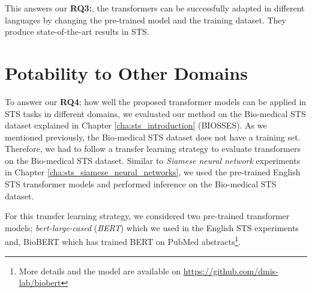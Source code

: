 This answers our \textbf{RQ3:}, the transformers can be successfully adapted in different languages by changing the pre-trained model and the training dataset. They produce state-of-the-art results in STS.

\section{Potability to Other Domains}
\label{sec:transformer_domain}
To answer our \textbf{RQ4}; how well the proposed transformer models can be applied in STS tasks in different domains, we evaluated our method on the Bio-medical STS dataset explained in Chapter \ref{cha:sts_introduction} (BIOSSES). As we mentioned previously, the Bio-medical STS dataset does not have a training set. Therefore, we had to follow a transfer learning strategy to evaluate transformers on the Bio-medical STS dataset. Similar to \textit{Siamese neural network} experiments in Chapter \ref{cha:sts_siamese_neural_networks}, we used the pre-trained English STS transformer models and performed inference on the Bio-medical STS dataset. 

For this transfer learning strategy, we considered two pre-trained transformer models; \textit{bert-large-cased} \autocite{devlin-etal-2019-bert} (\textit{BERT}) which we used in the English STS experiments and, BioBERT \autocite{10.1093/bioinformatics/btz682} which has trained BERT on PubMed abstracts\footnote{More details and the model are available on \url{https://github.com/dmis-lab/biobert}}.

\begin{table}[htb]
	\centering
	\caption[Results for transfer learning with transformers in the BIOSSES dataset]{Results for transfer learning with transformers in the BIOSSES dataset. Two considered pre-trained transformer models are textbf{BERT} and \textbf{BioBERT}. For ease of visualisation we only report the Pearson correlation ($\bm{\rho}$).}  
	\label{tab:transfer_transformers_biosses}
\end{table}


